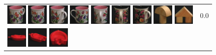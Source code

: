 \begin{figure}[tbp]
\begin{center}
\begin{tabular}{m{11cm} | m{3cm} |}
\includegraphics[width=1cm]{coil/beeld-9.eps}
\includegraphics[width=1cm]{coil/beeld-8.eps}
\includegraphics[width=1cm]{coil/beeld-10.eps}
\includegraphics[width=1cm]{coil/beeld-7.eps}
\includegraphics[width=1cm]{coil/beeld-11.eps}
\includegraphics[width=1cm]{coil/beeld-65.eps}
\includegraphics[width=1cm]{coil/beeld-64.eps}
\includegraphics[width=1cm]{coil/beeld-4.eps}
\includegraphics[width=1cm]{coil/beeld-43.eps}
& {\scriptsize 0.0}
\\
\includegraphics[width=1cm]{coil/beeld-18.eps}
\includegraphics[width=1cm]{coil/beeld-22.eps}
\includegraphics[width=1cm]{coil/beeld-23.eps}

\end{tabular}
\end{center}
\end{figure}
